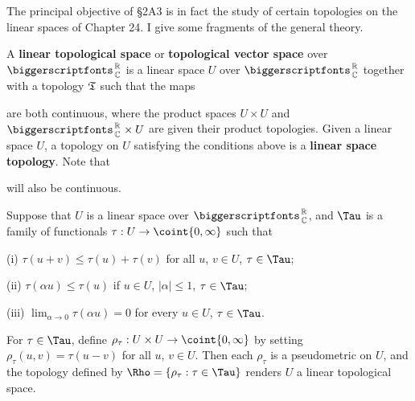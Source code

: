 
\def\chaptername{Appendix}
\def\sectionname{Linear topological spaces}


The principal objective of \S2A3 is in fact the study of certain
topologies on the linear spaces of Chapter 24.   I give some fragments
of the general theory.

 A {\bf linear topological space} or
{\bf topological vector space} over $\RoverC$ is a linear
space $U$ over $\RoverC$ together with a topology $\frak T$ such that
the maps



\noindent are both continuous, where the product spaces $U\times U$ and
$\RoverC\times U$ are given their product topologies.
Given a linear space $U$, a topology on $U$ satisfying the conditions
above is a {\bf linear space topology}.   Note that


\noindent will also be continuous.

 Suppose that $U$ is a linear space over
$\RoverC$, and $\Tau$
is a family of functionals $\tau:U\to\coint{0,\infty}$ such that

\quad (i) $\tau(u+v)\le\tau(u)+\tau(v)$ for all $u$, $v\in U$,
$\tau\in\Tau$;

\quad (ii) $\tau(\alpha u)\le\tau(u)$ if $u\in U$, $|\alpha|\le 1$,
$\tau\in\Tau$;

\quad (iii) $\lim_{\alpha\to 0}\tau(\alpha u)=0$ for every $u\in U$,
$\tau\in \Tau$.

\noindent For $\tau\in\Tau$, define
$\rho_{\tau}:U\times U\to\coint{0,\infty}$ by setting
$\rho_{\tau}(u,v)=\tau(u-v)$ for all $u$, $v\in U$.   Then each
$\rho_{\tau}$
is a pseudometric on $U$, and the topology defined by
$\Rho=\{\rho_{\tau}:\tau\in\Tau\}$ renders $U$ a linear topological
space.

